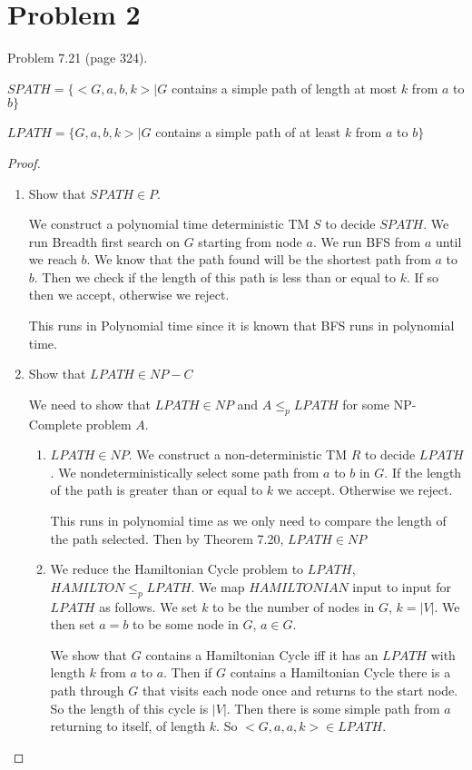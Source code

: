 \documentclass[11pt]{article}
\begin{document}
\newpage
\section*{Problem 2}
Problem 7.21 (page 324).

$SPATH = \{<G, a, b, k> | G$ contains a simple path of length at most $k$ from $a$ to $b\}$

$LPATH = \{G, a, b, k> | G$ contains a simple path of at least $k$ from $a$ to $b \}$


\begin{proof}


\begin{enumerate}[label=\alph*)]
\item  Show that $SPATH \in P$.

We construct a polynomial time deterministic TM $S$ to decide $SPATH$. We run Breadth first search on $G$ starting from node $a$. We run BFS from $a$ until we reach $b$. We know that the path found will be the shortest path from $a$ to $b$. Then we check if the length of this path is less than or equal to $k$. If so then we accept, otherwise we reject.

This runs in Polynomial time since it is known that BFS runs in polynomial time. 

\item Show that $LPATH \in NP-C$

We need to show that $LPATH \in NP$ and $A \leq _p LPATH$ for some NP-Complete problem $A$.

\begin{enumerate}[label=\arabic*)]

\item $LPATH \in NP$. We construct a non-deterministic TM $R$ to decide $LPATH$. We nondeterministically select some path from $a$ to $b$ in $G$. If the length of the path is greater than or equal to $k$ we accept. Otherwise we reject. 

This runs in polynomial time as we only need to compare the length of the path selected. Then by Theorem 7.20, $LPATH \in NP$


\item  We reduce the Hamiltonian Cycle problem to $LPATH$, $HAMILTON \leq _p LPATH$. We map $HAMILTONIAN$ input to input for $LPATH$ as follows. We set $k$ to be the number of nodes in $G$, $k = |V|$. We then set $a = b$ to be some node in $G$, $a \in G$.

We show that $G$ contains a Hamiltonian Cycle iff it has an $LPATH$ with length $k$ from $a$ to $a$.
Then if $G$ contains a Hamiltonian Cycle there is a path through $G$ that visits each node once and returns to the start node. So the length of this cycle is $|V|$. Then there is some simple path from $a$ returning to itself, of length $k$. So $<G, a, a, k> \in LPATH$.


\end{enumerate}
\end{enumerate}
\end{proof}
\end{document}
